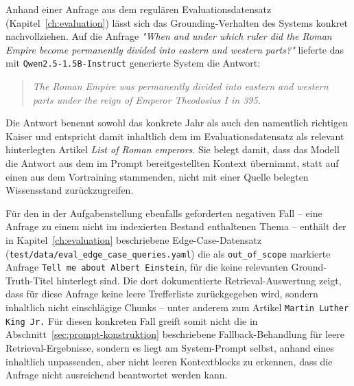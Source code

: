 Anhand einer Anfrage aus dem regulären Evaluationsdatensatz
(Kapitel~\ref{ch:evaluation}) lässt sich das Grounding-Verhalten des Systems
konkret nachvollziehen. Auf die Anfrage \textit{"When and under which ruler did the
Roman Empire become permanently divided into eastern and western parts?"} lieferte
das mit \texttt{Qwen2.\allowbreak{}5-\allowbreak{}1.\allowbreak{}5B-\allowbreak{}Instruct} generierte System die Antwort:

\begin{quote}
\itshape
The Roman Empire was permanently divided into eastern and western parts under the
reign of Emperor Theodosius I in 395.
\end{quote}

Die Antwort benennt sowohl das konkrete Jahr als auch den namentlich richtigen
Kaiser und entspricht damit inhaltlich dem im Evaluationsdatensatz als relevant
hinterlegten Artikel \textit{List of Roman emperors}. Sie belegt damit, dass das
Modell die Antwort aus dem im Prompt bereitgestellten Kontext übernimmt, statt auf
einen aus dem Vortraining stammenden, nicht mit einer Quelle belegten Wissensstand
zurückzugreifen.

Für den in der Aufgabenstellung ebenfalls geforderten negativen Fall -- eine Anfrage zu
einem nicht im indexierten Bestand enthaltenen Thema -- enthält der in
Kapitel~\ref{ch:evaluation} beschriebene Edge-Case-Datensatz
(\texttt{test/\allowbreak{}data/\allowbreak{}eval\_\allowbreak{}edge\_\allowbreak{}case\_\allowbreak{}queries.\allowbreak{}yaml}) die als \texttt{out\_of\_scope}
markierte Anfrage \texttt{Tell me about Albert Einstein}, für die keine relevanten
Ground-Truth-Titel hinterlegt sind. Die dort dokumentierte Retrieval-Auswertung zeigt,
dass für diese Anfrage keine leere Trefferliste zurückgegeben wird, sondern
inhaltlich nicht einschlägige Chunks -- unter anderem zum Artikel \texttt{Martin
Luther King Jr.\allowbreak{}} Für diesen konkreten Fall greift somit nicht die in
Abschnitt~\ref{sec:prompt-konstruktion} beschriebene Fallback-Behandlung für leere
Retrieval-Ergebnisse, sondern es liegt am System-Prompt selbst, anhand eines
inhaltlich unpassenden, aber nicht leeren Kontextblocks zu erkennen, dass die
Anfrage nicht ausreichend beantwortet werden kann.

